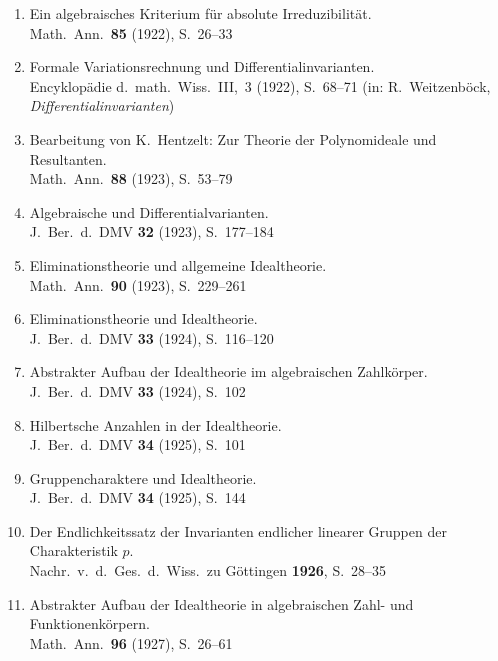 \documentclass[12pt,a4paper]{article}
\theoremstyle{plain}
\theoremstyle{definition}
\theoremstyle{remark}
\begin{document}
\begin{enumerate}[label={\small\arabic*.},leftmargin=2em,itemsep=0.3em]
\item Ein algebraisches Kriterium f\"ur absolute Irreduzibilit\"at.\\
Math.\ Ann.\ \textbf{85} (1922), S.~26--33

\item Formale Variationsrechnung und Differentialinvarianten.\\
Encyklop\"adie d.\ math.\ Wiss.\ III,\ 3 (1922), S.~68--71 (in:
R.\ Weitzenb\"ock, \textit{Differentialinvarianten})

\item Bearbeitung von K.\ Hentzelt: Zur Theorie der Polynomideale und Resultanten.\\
Math.\ Ann.\ \textbf{88} (1923), S.~53--79

\item Algebraische und Differentialvarianten.\\
J.\ Ber.\ d.\ DMV \textbf{32} (1923), S.~177--184

\item Eliminationstheorie und allgemeine Idealtheorie.\\
Math.\ Ann.\ \textbf{90} (1923), S.~229--261

\item Eliminationstheorie und Idealtheorie.\\
J.\ Ber.\ d.\ DMV \textbf{33} (1924), S.~116--120

\item Abstrakter Aufbau der Idealtheorie im algebraischen Zahlk\"orper.\\
J.\ Ber.\ d.\ DMV \textbf{33} (1924), S.~102

\item Hilbertsche Anzahlen in der Idealtheorie.\\
J.\ Ber.\ d.\ DMV \textbf{34} (1925), S.~101

\item Gruppencharaktere und Idealtheorie.\\
J.\ Ber.\ d.\ DMV \textbf{34} (1925), S.~144

\item Der Endlichkeitssatz der Invarianten endlicher linearer Gruppen der
Charakteristik $p$.\\
Nachr.\ v.\ d.\ Ges.\ d.\ Wiss.\ zu G\"ottingen \textbf{1926}, S.~28--35

\item Abstrakter Aufbau der Idealtheorie in algebraischen Zahl- und Funktionenk\"orpern.\\
Math.\ Ann.\ \textbf{96} (1927), S.~26--61


\end{enumerate}
\end{document}
